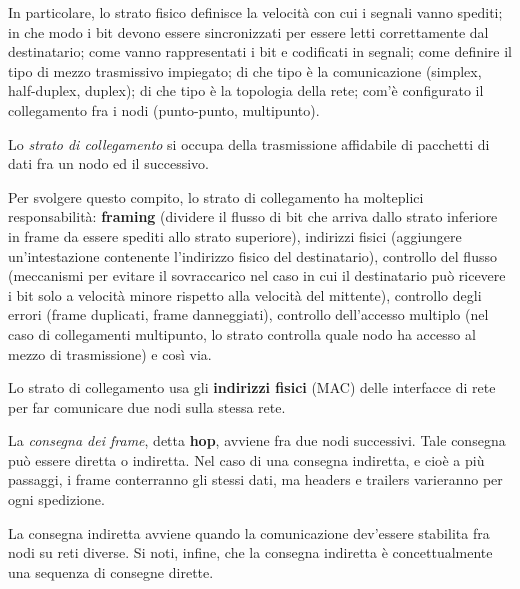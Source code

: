             \vspace{3mm}
            
            In particolare, lo strato fisico definisce la velocità con cui i segnali vanno spediti; in che modo i bit devono essere sincronizzati per essere letti correttamente dal destinatario; come vanno rappresentati i bit e codificati in segnali; come definire il tipo di mezzo trasmissivo impiegato; di che tipo è la comunicazione (simplex, half-duplex, duplex); di che tipo è la topologia della rete; com'è configurato il collegamento fra i nodi (punto-punto, multipunto).
        
        
            Lo \textit{strato di collegamento} si occupa della trasmissione affidabile di pacchetti di dati fra un nodo ed il successivo. 
            
            \vspace{3mm}
            
            Per svolgere questo compito, lo strato di collegamento ha molteplici responsabilità: \textbf{framing} (dividere il flusso di bit che arriva dallo strato inferiore in frame da essere spediti allo strato superiore), indirizzi fisici (aggiungere un'intestazione contenente l'indirizzo fisico del destinatario), controllo del flusso (meccanismi per evitare il sovraccarico nel caso in cui il destinatario può ricevere i bit solo a velocità minore rispetto alla velocità del mittente), controllo degli errori (frame duplicati, frame danneggiati), controllo dell'accesso multiplo (nel caso di collegamenti multipunto, lo strato controlla quale nodo ha accesso al mezzo di trasmissione) e così via.
            
            \vspace{3mm}
            
            Lo strato di collegamento usa gli \textbf{indirizzi fisici} (MAC) delle interfacce di rete per far comunicare due nodi sulla stessa rete.
            
            \vspace{3mm}
            
            La \textit{consegna dei frame}, detta \textbf{hop}, avviene fra due nodi successivi. Tale consegna può essere diretta o indiretta. Nel caso di una consegna indiretta, e cioè a più passaggi, i frame conterranno gli stessi dati, ma headers e trailers varieranno per ogni spedizione. 
            
            La consegna indiretta avviene quando la comunicazione dev'essere stabilita fra nodi su reti diverse. Si noti, infine, che la consegna indiretta è concettualmente una sequenza di consegne dirette.
        

